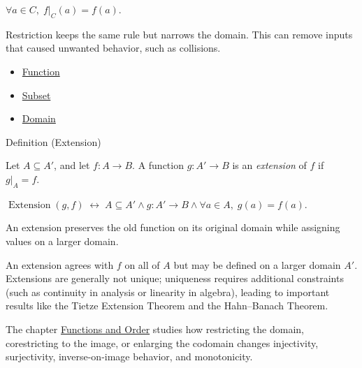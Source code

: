 \begin{remark*}
$\forall a\in C,\; f|_C(a)=f(a)$.
\end{remark*}

\begin{remark*}[Interpretation]
Restriction keeps the same rule but narrows the domain. This can remove inputs
that caused unwanted behavior, such as collisions.
\end{remark*}

\begin{dependencies}
\begin{itemize}
  \item \hyperref[def:function]{Function}
  \item \hyperref[def:subset]{Subset}
  \item \hyperref[def:domain]{Domain}
\end{itemize}
\end{dependencies}

\begin{definitionbox}{Definition (Extension)}
\begin{definition}[Extension]\label{def:fn-extension}
Let $A \subseteq A'$, and let $f : A \to B$. A function $g : A' \to B$ is an
\emph{extension} of $f$ if $g|_A = f$.
\end{definition}
\end{definitionbox}

\begin{remark*}
$\operatorname{Extension}(g,f)\;\leftrightarrow\; A\subseteq A' \wedge
g:A'\to B \wedge \forall a\in A,\; g(a)=f(a)$.
\end{remark*}

\begin{remark*}[Interpretation]
An extension preserves the old function on its original domain while assigning
values on a larger domain.
\end{remark*}

\begin{remark*}[Exposition]
An extension agrees with $f$ on all of $A$ but may be defined on a larger
domain $A'$. Extensions are generally not unique; uniqueness requires additional
constraints (such as continuity in analysis or linearity in algebra), leading to
important results like the Tietze Extension Theorem and the Hahn--Banach
Theorem.
\end{remark*}

\begin{remark*}[Exposition]
The chapter \hyperref[ch:functions-and-order]{Functions and Order} studies
how restricting the domain, corestricting to the image, or enlarging the
codomain changes injectivity, surjectivity, inverse-on-image behavior, and
monotonicity.
\end{remark*}

